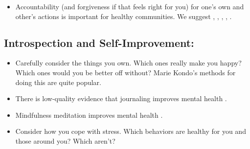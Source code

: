 \documentclass[12pt,letterpaper]{book}
\begin{document}
\begin{itemize}
   \item Accountability (and forgiveness if that feels right for you) for one's own and other's actions is important for healthy communities. We suggest \textcite{mingusAccountability}, \textcite{barnardCommunities}, \textcite{gottmanTrust}, \textcite{crucial}, \textcite{forgiving}. 
    
\end{itemize}
\subsection*{Introspection and Self-Improvement:}
\begin{itemize}
   \item Carefully consider the things you own. Which ones really make you happy? Which ones would you be better off without? Marie Kondo's methods for doing this are quite popular.
   \item There is low-quality evidence that journaling improves mental health \cite{sohalJournaling}.
   \item Mindfulness meditation improves mental health \cite{meditationMentalHealth}.
   \item Consider how you cope with stress. Which behaviors are healthy for you and those around you? Which aren't?
\end{itemize}
\end{document}
